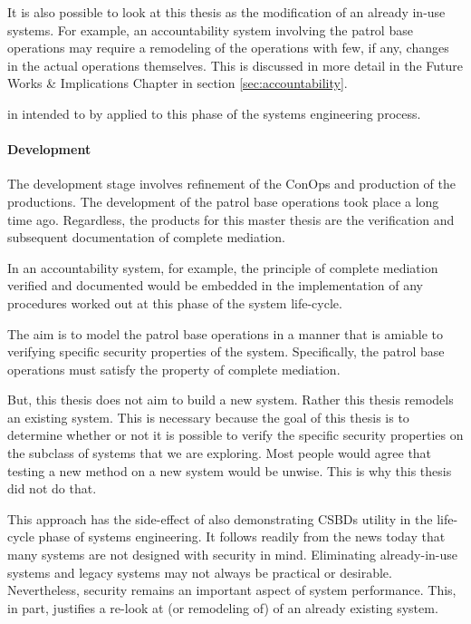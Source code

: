 \documentclass[../../main/main.tex]{subfiles}
\begin{document}
It is also possible to look at this thesis as the modification of an already in-use systems. For example, an accountability system involving the patrol base operations may require a remodeling of the operations with few, if any, changes in the actual operations themselves.  This is discussed in more detail in the Future Works \& Implications Chapter in section \ref{sec:accountability}.

 in intended to by applied to this phase of the systems engineering process.  
 
\paragraph*{Development}
The development stage involves refinement of the ConOps and production of the productions.  The development of the patrol base operations took place a long time ago.  Regardless, the products for this master thesis are the verification and subsequent documentation of complete mediation.  

In an accountability system, for example, the principle of complete mediation verified and documented would be embedded in the implementation of any procedures worked out at this phase of the system life-cycle.

 The aim is to model the patrol base operations in a manner that is amiable to verifying specific security properties of the system.  Specifically, the patrol base operations must satisfy the property of complete mediation. 


But, this thesis does not aim to build a new system.  Rather this thesis remodels an existing system.   This is necessary because the goal of this thesis is to determine whether or not it is possible to verify the specific security properties on the subclass of systems that we are exploring.  Most people would agree that testing a new method on a new system would be unwise.  This is why this thesis did not do that.    


This approach has the side-effect of also demonstrating CSBDs utility in the life-cycle phase of systems engineering.  It follows readily from the news today that many systems are not designed with security in mind.  Eliminating already-in-use systems and legacy systems may not always be practical or desirable.  Nevertheless, security remains an important aspect of system performance.  This, in part, justifies a re-look at (or remodeling of)  of an already existing system.
\end{document}
